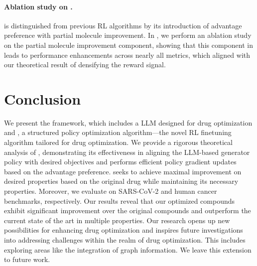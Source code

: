 \paragraph{Ablation study on \algname.} 
\algname is distinguished from previous RL algorithms by its introduction of advantage preference with partial molecule improvement. In , we perform an ablation study on the partial molecule improvement component, showing that this component in \algname leads to performance enhancements across nearly all metrics, which aligned with our theoretical result of  densifying the reward signal. 





\section{Conclusion}\label{sec:con}




We present the \fwname framework, which includes a LLM designed for drug optimization and \algname, a structured policy optimization algorithm—the novel RL finetuning algorithm tailored for drug optimization. 
We provide a rigorous theoretical analysis of \algname, demonstrating its effectiveness in aligning the LLM-based generator policy with desired objectives and performs efficient policy gradient updates based on the advantage preference. \algname seeks to achieve maximal improvement on desired properties based on the original drug while maintaining its necessary properties.
Moreover, we evaluate \fwname on SARS-CoV-2 and human cancer benchmarks, respectively. Our results reveal that our optimized compounds exhibit significant improvement over the original compounds and outperform the current state of the art in multiple properties.
Our research opens up new possibilities for enhancing drug optimization and inspires future investigations into addressing challenges within the realm of drug optimization. This includes exploring areas like the integration of graph information.
 We leave this extension to future work.






